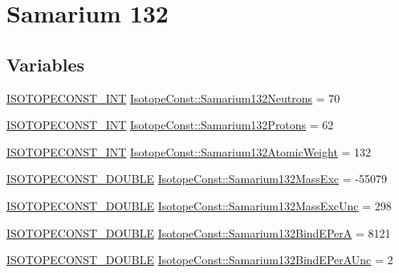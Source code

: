 \hypertarget{group___isotope_const-_samarium-_sm132}{}\section{Samarium 132}
\label{group___isotope_const-_samarium-_sm132}
\subsection*{Variables}
\begin{DoxyCompactItemize}
\item 
\mbox{\hyperlink{group___isotope_const-_macros_ga5f18360b3e99483a35c32d789e62621c}{I\+S\+O\+T\+O\+P\+E\+C\+O\+N\+S\+T\+\_\+\+I\+NT}} \mbox{\hyperlink{group___isotope_const-_samarium-_sm132_ga8213eb027dea280e0e61b7b558524e3c}{Isotope\+Const\+::\+Samarium132\+Neutrons}} = 70
\item 
\mbox{\hyperlink{group___isotope_const-_macros_ga5f18360b3e99483a35c32d789e62621c}{I\+S\+O\+T\+O\+P\+E\+C\+O\+N\+S\+T\+\_\+\+I\+NT}} \mbox{\hyperlink{group___isotope_const-_samarium-_sm132_ga49e19e9bf465ed9c2dd2fa7c8e8bb6a2}{Isotope\+Const\+::\+Samarium132\+Protons}} = 62
\item 
\mbox{\hyperlink{group___isotope_const-_macros_ga5f18360b3e99483a35c32d789e62621c}{I\+S\+O\+T\+O\+P\+E\+C\+O\+N\+S\+T\+\_\+\+I\+NT}} \mbox{\hyperlink{group___isotope_const-_samarium-_sm132_ga0c61ea973983fc002ca91bb1863cbe30}{Isotope\+Const\+::\+Samarium132\+Atomic\+Weight}} = 132
\item 
\mbox{\hyperlink{group___isotope_const-_macros_ga8f45a7272ce02c0b4c65c44636ed719a}{I\+S\+O\+T\+O\+P\+E\+C\+O\+N\+S\+T\+\_\+\+D\+O\+U\+B\+LE}} \mbox{\hyperlink{group___isotope_const-_samarium-_sm132_ga83f7da2c78926fbc233164779448e21f}{Isotope\+Const\+::\+Samarium132\+Mass\+Exc}} = -\/55079
\item 
\mbox{\hyperlink{group___isotope_const-_macros_ga8f45a7272ce02c0b4c65c44636ed719a}{I\+S\+O\+T\+O\+P\+E\+C\+O\+N\+S\+T\+\_\+\+D\+O\+U\+B\+LE}} \mbox{\hyperlink{group___isotope_const-_samarium-_sm132_ga255c497bbed5fe0b66247ac2e16b05e4}{Isotope\+Const\+::\+Samarium132\+Mass\+Exc\+Unc}} = 298
\item 
\mbox{\hyperlink{group___isotope_const-_macros_ga8f45a7272ce02c0b4c65c44636ed719a}{I\+S\+O\+T\+O\+P\+E\+C\+O\+N\+S\+T\+\_\+\+D\+O\+U\+B\+LE}} \mbox{\hyperlink{group___isotope_const-_samarium-_sm132_ga423a04e519b0258e1f21ab7bd5a9ffec}{Isotope\+Const\+::\+Samarium132\+Bind\+E\+PerA}} = 8121
\item 
\mbox{\hyperlink{group___isotope_const-_macros_ga8f45a7272ce02c0b4c65c44636ed719a}{I\+S\+O\+T\+O\+P\+E\+C\+O\+N\+S\+T\+\_\+\+D\+O\+U\+B\+LE}} \mbox{\hyperlink{group___isotope_const-_samarium-_sm132_ga5d539a48f6754c1464a1fdd099ad9cb8}{Isotope\+Const\+::\+Samarium132\+Bind\+E\+Per\+A\+Unc}} = 2

\end{DoxyCompactItemize}
